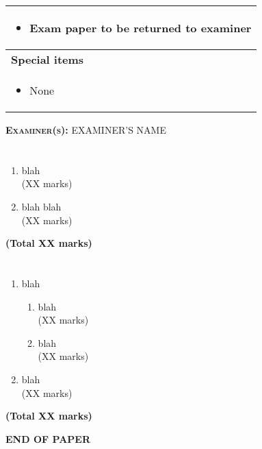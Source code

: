 \documentclass[12pt, a4paper, twosize]{article}
\begin{document}
\begin{titlepage}
\begin{table}[H]
\begin{tabular}{|p{14cm}|}
    \begin{itemize}
      \item Exam paper to be returned to examiner
    \end{itemize} \\

\hline
{\bf{Special items}}\\ 

    \begin{itemize}
      \item None
    \end{itemize} \\

\hline
\end{tabular}
\end{table}

\textsc{\Large {\bf{Examiner(s):}} EXAMINER'S NAME}

\end{titlepage}


\section{}
\begin{enumerate}
\item blah\\
\hspace*{\fill} (XX marks)
\item blah blah\\
\hspace*{\fill} (XX marks)
\end{enumerate}
\hspace*{\fill} {\bf{(Total XX marks)}}


\section{}
\begin{enumerate}
\item blah\\

    \begin{enumerate}[label=\roman*.]

    \item blah\\
    \hspace*{\fill} (XX marks)

    \item blah\\
    \hspace*{\fill} (XX marks)

    \end{enumerate}

\item blah\\
    \hspace*{\fill} (XX marks)
\end{enumerate}
\hspace*{\fill} {\bf{(Total XX marks)}}



\vspace*{2.5cm}
\centerline{{\bf{END OF PAPER}}}
\end{document}
